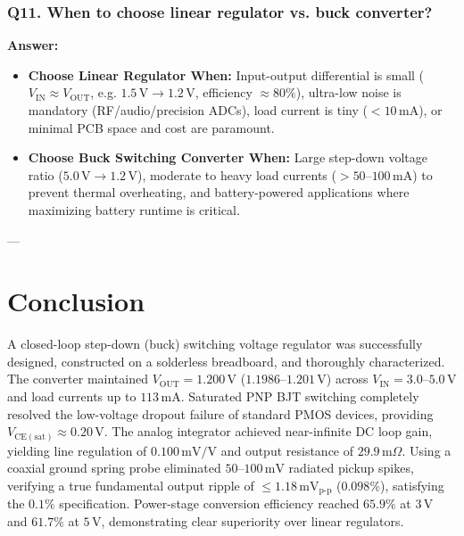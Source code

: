 \documentclass[11pt,a4paper]{article}
\begin{document}
\subsubsection*{Q11. When to choose linear regulator vs. buck converter?}
\textbf{Answer:} 
\begin{itemize}
    \item \textbf{Choose Linear Regulator When:} Input-output differential is small ($V_{\mathrm{IN}} \approx V_{\mathrm{OUT}}$, e.g. $1.5\,\mathrm{V} \to 1.2\,\mathrm{V}$, efficiency $\approx 80\%$), ultra-low noise is mandatory (RF/audio/precision ADCs), load current is tiny ($<10\,\mathrm{mA}$), or minimal PCB space and cost are paramount.
    \item \textbf{Choose Buck Switching Converter When:} Large step-down voltage ratio ($5.0\,\mathrm{V} \to 1.2\,\mathrm{V}$), moderate to heavy load currents ($>50\text{--}100\,\mathrm{mA}$) to prevent thermal overheating, and battery-powered applications where maximizing battery runtime is critical.
\end{itemize}

---

\section{Conclusion}
A closed-loop step-down (buck) switching voltage regulator was successfully designed, constructed on a solderless breadboard, and thoroughly characterized. The converter maintained $V_{\mathrm{OUT}} = 1.200\,\mathrm{V}$ ($1.1986\text{--}1.201\,\mathrm{V}$) across $V_{\mathrm{IN}} = 3.0\text{--}5.0\,\mathrm{V}$ and load currents up to $113\,\mathrm{mA}$. Saturated PNP BJT switching completely resolved the low-voltage dropout failure of standard PMOS devices, providing $V_{\mathrm{CE(sat)}} \approx 0.20\,\mathrm{V}$. The analog integrator achieved near-infinite DC loop gain, yielding line regulation of $0.100\,\mathrm{mV/V}$ and output resistance of $29.9\,\mathrm{m}\Omega$. Using a coaxial ground spring probe eliminated $50\text{--}100\,\mathrm{mV}$ radiated pickup spikes, verifying a true fundamental output ripple of $\le 1.18\,\mathrm{mV}_{\mathrm{p\text{-}p}}$ ($0.098\%$), satisfying the $0.1\%$ specification. Power-stage conversion efficiency reached $65.9\%$ at $3\,\mathrm{V}$ and $61.7\%$ at $5\,\mathrm{V}$, demonstrating clear superiority over linear regulators.
\end{document}
